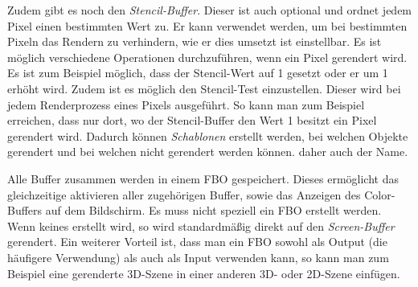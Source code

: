 Zudem gibt es noch den \textit{Stencil-Buffer}. Dieser ist auch optional und ordnet jedem Pixel einen bestimmten Wert zu. Er kann verwendet werden, um bei bestimmten Pixeln das Rendern zu verhindern, wie er dies umsetzt ist einstellbar. Es ist möglich verschiedene Operationen durchzuführen, wenn ein Pixel gerendert wird. Es ist zum Beispiel möglich, dass der Stencil-Wert auf 1 gesetzt oder er um 1 erhöht wird. Zudem ist es möglich den Stencil-Test einzustellen. Dieser wird bei jedem Renderprozess eines Pixels ausgeführt. So kann man zum Beispiel erreichen, dass nur dort, wo der Stencil-Buffer den Wert 1 besitzt ein Pixel gerendert wird. Dadurch können \textit{Schablonen} erstellt werden, bei welchen Objekte gerendert und bei welchen nicht gerendert werden können. daher auch der Name.

Alle Buffer zusammen werden in einem \ac{FBO} gespeichert. Dieses ermöglicht das gleichzeitige aktivieren aller zugehörigen Buffer, sowie das Anzeigen des Color-Buffers auf dem Bildschirm. Es muss nicht speziell ein \ac{FBO} erstellt werden. Wenn keines erstellt wird, so wird standardmäßig direkt auf den \textit{Screen-Buffer} gerendert. Ein weiterer Vorteil ist, dass man ein \ac{FBO} sowohl als Output (die häufigere Verwendung) als auch als Input verwenden kann, so kann man zum Beispiel eine gerenderte 3D-Szene in einer anderen 3D- oder 2D-Szene einfügen.  

